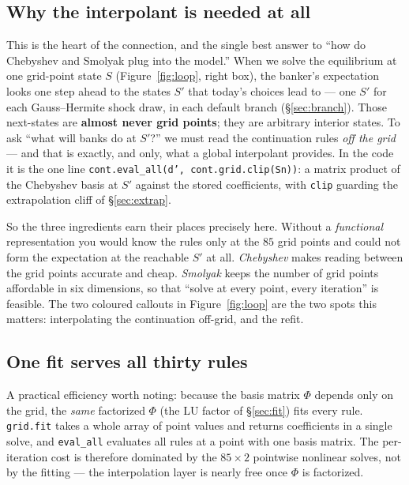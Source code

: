 \documentclass[11pt]{article}
\newcommand{\code}[1]{\texttt{#1}}
\begin{document}
\subsection{Why the interpolant is needed at all}

This is the heart of the connection, and the single best answer to ``how do
Chebyshev and Smolyak plug into the model.'' When we solve the equilibrium at
one grid-point state $S$ (Figure~\ref{fig:loop}, right box), the banker's
expectation looks one step ahead to the states $S'$ that today's choices lead
to --- one $S'$ for each Gauss--Hermite shock draw, in each default branch
(\S\ref{sec:branch}). Those next-states are \textbf{almost never grid points};
they are arbitrary interior states. To ask ``what will banks do at $S'$?'' we
must read the continuation rules \emph{off the grid} --- and that is exactly,
and only, what a global interpolant provides. In the code it is the one line
\code{cont.eval\_all(d', cont.grid.clip(Sn))}: a matrix product of the
Chebyshev basis at $S'$ against the stored coefficients, with \code{clip}
guarding the extrapolation cliff of \S\ref{sec:extrap}.

So the three ingredients earn their places precisely here. Without a
\emph{functional} representation you would know the rules only at the $85$
grid points and could not form the expectation at the reachable $S'$ at all.
\emph{Chebyshev} makes reading between the grid points accurate and cheap.
\emph{Smolyak} keeps the number of grid points affordable in six dimensions,
so that ``solve at every point, every iteration'' is feasible. The two
coloured callouts in Figure~\ref{fig:loop} are the two spots this matters:
interpolating the continuation off-grid, and the refit.

\subsection{One fit serves all thirty rules}

A practical efficiency worth noting: because the basis matrix $\Phi$ depends
only on the grid, the \emph{same} factorized $\Phi$ (the LU factor of
\S\ref{sec:fit}) fits every rule. \code{grid.fit} takes a whole array of
point values and returns coefficients in a single solve, and
\code{eval\_all} evaluates all rules at a point with one basis matrix. The
per-iteration cost is therefore dominated by the $85\times2$ pointwise
nonlinear solves, not by the fitting --- the interpolation layer is nearly
free once $\Phi$ is factorized.
\end{document}
